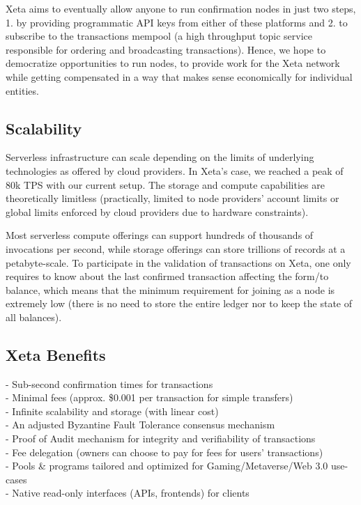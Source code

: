 \documentclass{article}
\begin{document}
Xeta aims to eventually allow anyone to run confirmation nodes in just two steps, 1. by providing programmatic API keys from either of these platforms and 2. to subscribe to the transactions mempool (a high throughput topic service responsible for ordering and broadcasting transactions). Hence, we hope to democratize opportunities to run nodes, to provide work for the Xeta network while getting compensated in a way that makes sense economically for individual entities.

\subsection{Scalability}

Serverless infrastructure can scale depending on the limits of underlying technologies as offered by cloud providers. In Xeta's case, we reached a peak of 80k TPS with our current setup. The storage and compute capabilities are theoretically limitless (practically, limited to node providers' account limits or global limits enforced by cloud providers due to hardware constraints).
\bigskip

Most serverless compute offerings can support hundreds of thousands of invocations per second, while storage offerings can store trillions of records at a petabyte-scale. To participate in the validation of transactions on Xeta, one only requires to know about the last confirmed transaction affecting the form/to balance, which means that the minimum requirement for joining as a node is extremely low (there is no need to store the entire ledger nor to keep the state of all balances).

\subsection{Xeta Benefits}
- Sub-second confirmation times for transactions\\
- Minimal fees (approx. \$0.001 per transaction for simple transfers)\\
- Infinite scalability and storage (with linear cost)\\
- An adjusted Byzantine Fault Tolerance consensus mechanism\\
- Proof of Audit mechanism for integrity and verifiability of transactions\\
- Fee delegation (owners can choose to pay for fees for users' transactions)\\
- Pools \& programs tailored and optimized for Gaming/Metaverse/Web 3.0 use-cases\\
- Native read-only interfaces (APIs, frontends) for clients
\end{document}
